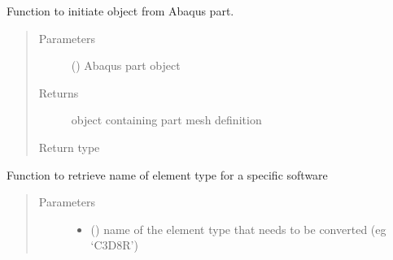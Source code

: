 \documentclass[letterpaper,10pt,english]{sphinxmanual}
\begin{document}
\begin{fulllineitems}
\begin{fulllineitems}
\begin{quote}
\begin{description}
\end{description}\end{quote}

\end{fulllineitems}


\begin{fulllineitems}
\label{\detokenize{pyCofea/api:cofea.PartMesh.fromAbaqusCae}}
Function to initiate object from Abaqus part.
\begin{quote}\begin{description}
\item[{Parameters}] \leavevmode
{} () \textendash{} Abaqus part object

\item[{Returns}] \leavevmode
object containing part mesh definition

\item[{Return type}] \leavevmode
{\hyperref[\detokenize{pyCofea/api:cofea.PartMesh}]{}}

\end{description}\end{quote}

\end{fulllineitems}


\begin{fulllineitems}
\label{\detokenize{pyCofea/api:cofea.PartMesh.getDiffFormatForElType}}
Function to retrieve name of element type for a
specific software
\begin{quote}\begin{description}
\item[{Parameters}] \leavevmode\begin{itemize}
\item {} 
 () \textendash{} name of the element type that needs to be
converted (eg ‘C3D8R’)


\end{itemize}
\end{description}
\end{quote}
\end{fulllineitems}
\end{fulllineitems}
\end{document}
